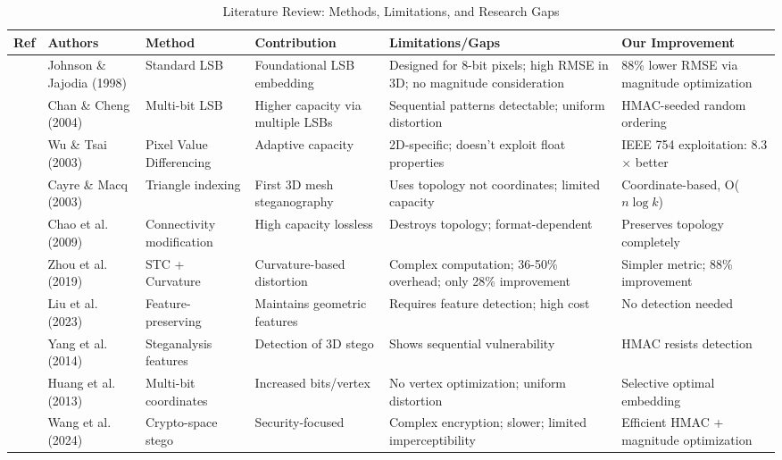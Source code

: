 \documentclass[conference]{IEEEtran}
\begin{document}
\begin{table}[htbp]
\caption{Literature Review: Methods, Limitations, and Research Gaps}
\label{tab:literature}
\centering
\small
\begin{tabular}{|p{0.6cm}|p{2.2cm}|p{2.5cm}|p{3.2cm}|p{3.5cm}|p{2.8cm}|}
\hline
\textbf{Ref} & \textbf{Authors} & \textbf{Method} & \textbf{Contribution} & \textbf{Limitations/Gaps} & \textbf{Our Improvement} \\
\hline
\cite{johnson1998exploring} & Johnson \& Jajodia (1998) & Standard LSB & Foundational LSB embedding & Designed for 8-bit pixels; high RMSE in 3D; no magnitude consideration & 88\% lower RMSE via magnitude optimization \\
\hline
\cite{chan2004hiding} & Chan \& Cheng (2004) & Multi-bit LSB & Higher capacity via multiple LSBs & Sequential patterns detectable; uniform distortion & HMAC-seeded random ordering \\
\hline
\cite{wu2003steganographic} & Wu \& Tsai (2003) & Pixel Value Differencing & Adaptive capacity & 2D-specific; doesn't exploit float properties & IEEE 754 exploitation: 8.3$\times$ better \\
\hline
\cite{cayre2003data} & Cayre \& Macq (2003) & Triangle indexing & First 3D mesh steganography & Uses topology not coordinates; limited capacity & Coordinate-based, O($n \log k$) \\
\hline
\cite{chao2009high} & Chao et al. (2009) & Connectivity modification & High capacity lossless & Destroys topology; format-dependent & Preserves topology completely \\
\hline
\cite{zhou2019distortion} & Zhou et al. (2019) & STC + Curvature & Curvature-based distortion & Complex computation; 36-50\% overhead; only 28\% improvement & Simpler metric; 88\% improvement \\
\hline
\cite{liu2023adaptive} & Liu et al. (2023) & Feature-preserving & Maintains geometric features & Requires feature detection; high cost & No detection needed \\
\hline
\cite{yang2014mesh} & Yang et al. (2014) & Steganalysis features & Detection of 3D stego & Shows sequential vulnerability & HMAC resists detection \\
\hline
\cite{huang2013multi} & Huang et al. (2013) & Multi-bit coordinates & Increased bits/vertex & No vertex optimization; uniform distortion & Selective optimal embedding \\
\hline
\cite{wang2024crypto} & Wang et al. (2024) & Crypto-space stego & Security-focused & Complex encryption; slower; limited imperceptibility & Efficient HMAC + magnitude optimization \\
\hline
\end{tabular}
\end{table}
\end{document}
